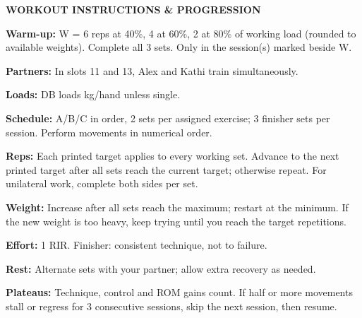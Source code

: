 \documentclass[10pt,a4paper]{article}
\begin{document}
\begin{tcolorbox}[colback=panelbg,colframe=grid,boxrule=0.5pt,arc=1.5mm,left=2mm,right=2mm,top=1.7mm,bottom=1.7mm,boxsep=0pt,before skip=0pt,after skip=0pt]
\textbf{WORKOUT INSTRUCTIONS \& PROGRESSION}\par\vspace{1.0mm}
\begin{minipage}[t]{0.485\linewidth}\raggedright
\textbf{Warm-up:} W = 6 reps at 40\%, 4 at 60\%, 2 at 80\% of working load (rounded to available weights). Complete all 3 sets. Only in the session(s) marked beside W.\par\vspace{0.8mm}
\textbf{Partners:} In slots 11 and 13, Alex and Kathi train simultaneously.\par\vspace{0.8mm}
\textbf{Loads:} DB loads kg/hand unless single.\par\vspace{0.8mm}
\textbf{Schedule:} A/B/C in order, 2 sets per assigned exercise; 3 finisher sets per session. Perform movements in numerical order.\par\vspace{0.8mm}
\textbf{Reps:} Each printed target applies to every working set. Advance to the next printed target after all sets reach the current target; otherwise repeat. For unilateral work, complete both sides per set.
\end{minipage}\hfill
\begin{minipage}[t]{0.485\linewidth}\raggedright
\textbf{Weight:} Increase after all sets reach the maximum; restart at the minimum. If the new weight is too heavy, keep trying until you reach the target repetitions.\par\vspace{0.8mm}
\textbf{Effort:} 1 RIR. Finisher: consistent technique, not to failure.\par\vspace{0.8mm}
\textbf{Rest:} Alternate sets with your partner; allow extra recovery as needed.\par\vspace{0.8mm}
\textbf{Plateaus:} Technique, control and ROM gains count. If half or more movements stall or regress for 3 consecutive sessions, skip the next session, then resume.
\end{minipage}
\end{tcolorbox}
\end{document}
